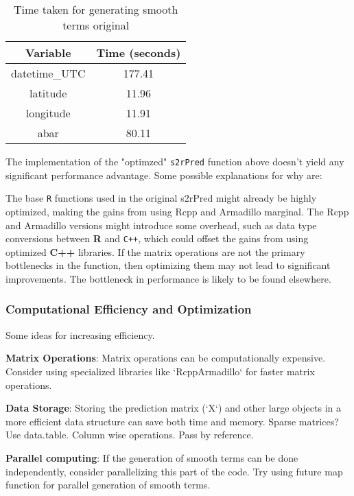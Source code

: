 \begin{table}[h]
\centering
\caption{Time taken for generating smooth terms original}
\label{tab:timing_most_recent}
\begin{tabular}{|c|c|}
\hline
Variable & Time (seconds) \\
\hline
datetime\_UTC & 177.41 \\
latitude & 11.96 \\
longitude & 11.91 \\
abar & 80.11 \\
\hline
\end{tabular}
\end{table}


The implementation of the "optimzed" \texttt{s2rPred} function above doesn't yield any significant performance advantage. Some possible explanations for why are:
\newline

The base \texttt{R} functions used in the original s2rPred might already be highly optimized, making the gains from using Rcpp and Armadillo marginal. The Rcpp and Armadillo versions might introduce some overhead, such as data type conversions between \textbf{R} and \texttt{C++}, which could offset the gains from using optimized \textbf{C++} libraries. If the matrix operations are not the primary bottlenecks in the function, then optimizing them may not lead to significant improvements. The bottleneck in performance is likely to be found elsewhere. 




\subsubsection{Computational Efficiency and Optimization}

Some ideas for increasing efficiency. 
\newline


\textbf{Matrix Operations}: Matrix operations can be computationally expensive. Consider using specialized libraries like `RcppArmadillo` for faster matrix operations.
\newline

\textbf{Data Storage}: Storing the prediction matrix (`X`) and other large objects in a more efficient data structure can save both time and memory. Sparse matrices? Use data.table. Column wise operations. Pass by reference. 
\newline

\textbf{Parallel computing}: If the generation of smooth terms can be done independently, consider parallelizing this part of the code. Try using future map function for parallel generation of smooth terms. 
\newline


